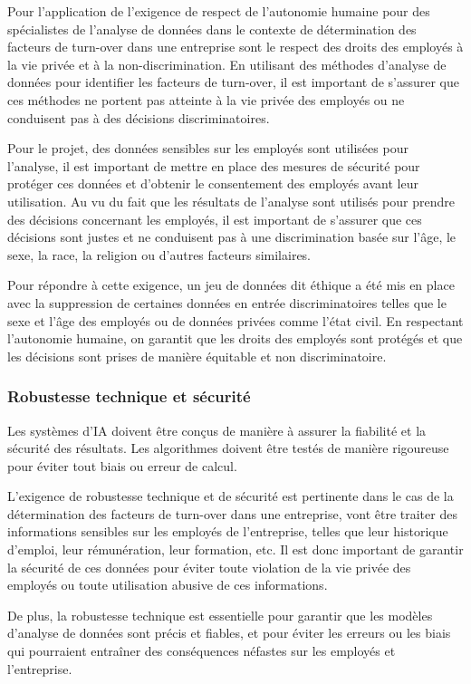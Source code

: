 Pour l'application de l'exigence de respect de l'autonomie humaine pour des spécialistes de l'analyse de données dans le contexte de détermination des facteurs de turn-over dans une entreprise sont le respect des droits des employés à la vie privée et à la non-discrimination. En utilisant des méthodes d'analyse de données pour identifier les facteurs de turn-over, il est important de s'assurer que ces méthodes ne portent pas atteinte à la vie privée des employés ou ne conduisent pas à des décisions discriminatoires.  

Pour le projet, des données sensibles sur les employés sont utilisées pour l'analyse, il est important de mettre en place des mesures de sécurité pour protéger ces données et d'obtenir le consentement des employés avant leur utilisation. Au vu du fait que les résultats de l'analyse sont utilisés pour prendre des décisions concernant les employés, il est important de s'assurer que ces décisions sont justes et ne conduisent pas à une discrimination basée sur l'âge, le sexe, la race, la religion ou d'autres facteurs similaires. 

Pour répondre à cette exigence, un jeu de données dit éthique a été mis en place avec la suppression de certaines données en entrée discriminatoires telles que le sexe et l'âge des employés ou de données privées comme l'état civil. En respectant l'autonomie humaine, on garantit que les droits des employés sont protégés et que les décisions sont prises de manière équitable et non discriminatoire. 

\subsubsection{Robustesse technique et sécurité}
Les systèmes d'IA doivent être conçus de manière à assurer la fiabilité et la sécurité des résultats. Les algorithmes doivent être testés de manière rigoureuse pour éviter tout biais ou erreur de calcul. 

L'exigence de robustesse technique et de sécurité est pertinente dans le cas de la détermination des facteurs de turn-over dans une entreprise, vont être traiter des informations sensibles sur les employés de l'entreprise, telles que leur historique d'emploi, leur rémunération, leur formation, etc. Il est donc important de garantir la sécurité de ces données pour éviter toute violation de la vie privée des employés ou toute utilisation abusive de ces informations.  

De plus, la robustesse technique est essentielle pour garantir que les modèles d'analyse de données sont précis et fiables, et pour éviter les erreurs ou les biais qui pourraient entraîner des conséquences néfastes sur les employés et l'entreprise.  

